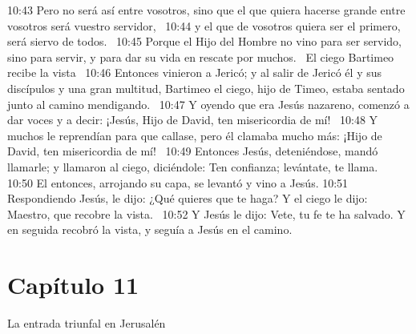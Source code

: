 10:43 Pero no será así entre vosotros, sino que el que quiera hacerse grande entre vosotros será vuestro servidor,  
10:44 y el que de vosotros quiera ser el primero, será siervo de todos.  
10:45 Porque el Hijo del Hombre no vino para ser servido, sino para servir, y para dar su vida en rescate por muchos.  
El ciego Bartimeo recibe la vista   
10:46 Entonces vinieron a Jericó; y al salir de Jericó él y sus discípulos y una gran multitud, Bartimeo el ciego, hijo de Timeo, estaba sentado junto al camino mendigando.  
10:47 Y oyendo que era Jesús nazareno, comenzó a dar voces y a decir: ¡Jesús, Hijo de David, ten misericordia de mí!  
10:48 Y muchos le reprendían para que callase, pero él clamaba mucho más: ¡Hijo de David, ten misericordia de mí!  
10:49 Entonces Jesús, deteniéndose, mandó llamarle; y llamaron al ciego, diciéndole: Ten confianza; levántate, te llama.  
10:50 El entonces, arrojando su capa, se levantó y vino a Jesús. 
10:51 Respondiendo Jesús, le dijo: ¿Qué quieres que te haga? Y el ciego le dijo: Maestro, que recobre la vista.  
10:52 Y Jesús le dijo: Vete, tu fe te ha salvado. Y en seguida recobró la vista, y seguía a Jesús en el camino.  
\section*{Capítulo 11}
La entrada triunfal en Jerusalén   

